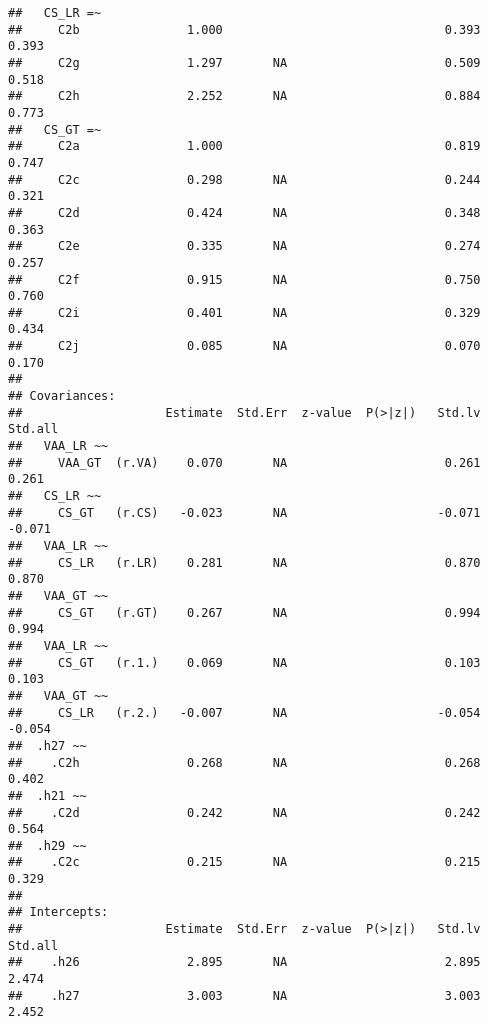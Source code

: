 \documentclass[
]{article}
\begin{document}
\begin{verbatim}
##   CS_LR =~                                                              
##     C2b               1.000                               0.393    0.393
##     C2g               1.297       NA                      0.509    0.518
##     C2h               2.252       NA                      0.884    0.773
##   CS_GT =~                                                              
##     C2a               1.000                               0.819    0.747
##     C2c               0.298       NA                      0.244    0.321
##     C2d               0.424       NA                      0.348    0.363
##     C2e               0.335       NA                      0.274    0.257
##     C2f               0.915       NA                      0.750    0.760
##     C2i               0.401       NA                      0.329    0.434
##     C2j               0.085       NA                      0.070    0.170
## 
## Covariances:
##                    Estimate  Std.Err  z-value  P(>|z|)   Std.lv  Std.all
##   VAA_LR ~~                                                             
##     VAA_GT  (r.VA)    0.070       NA                      0.261    0.261
##   CS_LR ~~                                                              
##     CS_GT   (r.CS)   -0.023       NA                     -0.071   -0.071
##   VAA_LR ~~                                                             
##     CS_LR   (r.LR)    0.281       NA                      0.870    0.870
##   VAA_GT ~~                                                             
##     CS_GT   (r.GT)    0.267       NA                      0.994    0.994
##   VAA_LR ~~                                                             
##     CS_GT   (r.1.)    0.069       NA                      0.103    0.103
##   VAA_GT ~~                                                             
##     CS_LR   (r.2.)   -0.007       NA                     -0.054   -0.054
##  .h27 ~~                                                                
##    .C2h               0.268       NA                      0.268    0.402
##  .h21 ~~                                                                
##    .C2d               0.242       NA                      0.242    0.564
##  .h29 ~~                                                                
##    .C2c               0.215       NA                      0.215    0.329
## 
## Intercepts:
##                    Estimate  Std.Err  z-value  P(>|z|)   Std.lv  Std.all
##    .h26               2.895       NA                      2.895    2.474
##    .h27               3.003       NA                      3.003    2.452

\end{verbatim}
\end{document}
